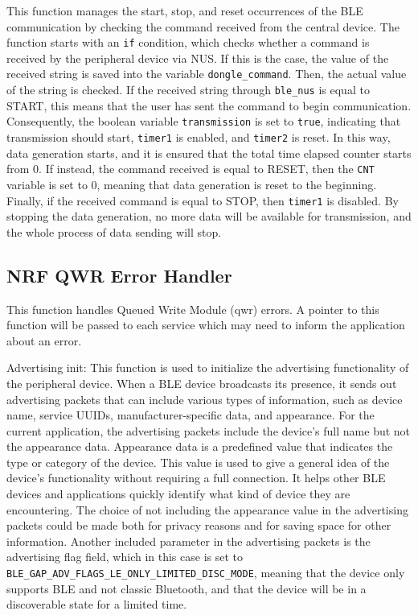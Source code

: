 \documentclass{Configuration_Files/PoliMi3i_thesis}
\begin{document}
This function manages the start, stop, and reset occurrences of the BLE communication by checking the command received from the central device. The function starts with an \texttt{if} condition, which checks whether a command is received by the peripheral device via NUS. If this is the case, the value of the received string is saved into the variable \texttt{dongle\_command}. Then, the actual value of the string is checked. If the received string through \texttt{ble\_nus} is equal to START, this means that the user has sent the command to begin communication. Consequently, the boolean variable \texttt{transmission} is set to \texttt{true}, indicating that transmission should start, \texttt{timer1} is enabled, and \texttt{timer2} is reset. In this way, data generation starts, and it is ensured that the total time elapsed counter starts from 0. If instead, the command received is equal to RESET, then the \texttt{CNT} variable is set to 0, meaning that data generation is reset to the beginning. Finally, if the received command is equal to STOP, then \texttt{timer1} is disabled. By stopping the data generation, no more data will be available for transmission, and the whole process of data sending will stop.

\subsection*{NRF QWR Error Handler}

This function handles Queued Write Module (qwr) errors. A pointer to this function will be passed to each service which may need to inform the application about an error.

Advertising init: This function is used to initialize the advertising functionality of the peripheral device. When a BLE device broadcasts its presence, it sends out advertising packets that can include various types of information, such as device name, service UUIDs, manufacturer-specific data, and appearance. For the current application, the advertising packets include the device’s full name but not the appearance data. Appearance data is a predefined value that indicates the type or category of the device. This value is used to give a general idea of the device's functionality without requiring a full connection. It helps other BLE devices and applications quickly identify what kind of device they are encountering. The choice of not including the appearance value in the advertising packets could be made both for privacy reasons and for saving space for other information. Another included parameter in the advertising packets is the advertising flag field, which in this case is set to \texttt{BLE\_GAP\_ADV\_FLAGS\_LE\_ONLY\_LIMITED\_DISC\_MODE}, meaning that the device only supports BLE and not classic Bluetooth, and that the device will be in a discoverable state for a limited time. 
\end{document}
